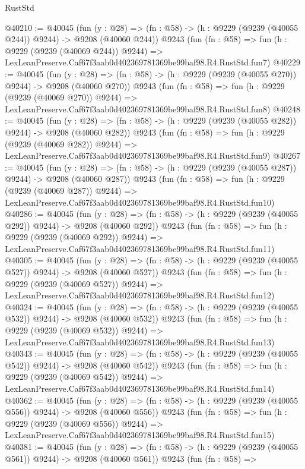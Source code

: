 \begin{lexlean}{RustStd}
\begin{coremodule}
@40210 := @40045
    (fun (y : @28) => (fn : @58) -> (h : @9229 (@9239 (@40055 @244)) @9244) -> @9208 (@40060 @244))
    @9243
    (fun (fn : @58) =>
    fun (h : @9229 (@9239 (@40069 @244)) @9244) =>
    LexLeanPreserve.Caf67f3aab0d402369781369be99baf98.R4.RustStd.fun7)
@40229 := @40045
    (fun (y : @28) => (fn : @58) -> (h : @9229 (@9239 (@40055 @270)) @9244) -> @9208 (@40060 @270))
    @9243
    (fun (fn : @58) =>
    fun (h : @9229 (@9239 (@40069 @270)) @9244) =>
    LexLeanPreserve.Caf67f3aab0d402369781369be99baf98.R4.RustStd.fun8)
@40248 := @40045
    (fun (y : @28) => (fn : @58) -> (h : @9229 (@9239 (@40055 @282)) @9244) -> @9208 (@40060 @282))
    @9243
    (fun (fn : @58) =>
    fun (h : @9229 (@9239 (@40069 @282)) @9244) =>
    LexLeanPreserve.Caf67f3aab0d402369781369be99baf98.R4.RustStd.fun9)
@40267 := @40045
    (fun (y : @28) => (fn : @58) -> (h : @9229 (@9239 (@40055 @287)) @9244) -> @9208 (@40060 @287))
    @9243
    (fun (fn : @58) =>
    fun (h : @9229 (@9239 (@40069 @287)) @9244) =>
    LexLeanPreserve.Caf67f3aab0d402369781369be99baf98.R4.RustStd.fun10)
@40286 := @40045
    (fun (y : @28) => (fn : @58) -> (h : @9229 (@9239 (@40055 @292)) @9244) -> @9208 (@40060 @292))
    @9243
    (fun (fn : @58) =>
    fun (h : @9229 (@9239 (@40069 @292)) @9244) =>
    LexLeanPreserve.Caf67f3aab0d402369781369be99baf98.R4.RustStd.fun11)
@40305 := @40045
    (fun (y : @28) => (fn : @58) -> (h : @9229 (@9239 (@40055 @527)) @9244) -> @9208 (@40060 @527))
    @9243
    (fun (fn : @58) =>
    fun (h : @9229 (@9239 (@40069 @527)) @9244) =>
    LexLeanPreserve.Caf67f3aab0d402369781369be99baf98.R4.RustStd.fun12)
@40324 := @40045
    (fun (y : @28) => (fn : @58) -> (h : @9229 (@9239 (@40055 @532)) @9244) -> @9208 (@40060 @532))
    @9243
    (fun (fn : @58) =>
    fun (h : @9229 (@9239 (@40069 @532)) @9244) =>
    LexLeanPreserve.Caf67f3aab0d402369781369be99baf98.R4.RustStd.fun13)
@40343 := @40045
    (fun (y : @28) => (fn : @58) -> (h : @9229 (@9239 (@40055 @542)) @9244) -> @9208 (@40060 @542))
    @9243
    (fun (fn : @58) =>
    fun (h : @9229 (@9239 (@40069 @542)) @9244) =>
    LexLeanPreserve.Caf67f3aab0d402369781369be99baf98.R4.RustStd.fun14)
@40362 := @40045
    (fun (y : @28) => (fn : @58) -> (h : @9229 (@9239 (@40055 @556)) @9244) -> @9208 (@40060 @556))
    @9243
    (fun (fn : @58) =>
    fun (h : @9229 (@9239 (@40069 @556)) @9244) =>
    LexLeanPreserve.Caf67f3aab0d402369781369be99baf98.R4.RustStd.fun15)
@40381 := @40045
    (fun (y : @28) => (fn : @58) -> (h : @9229 (@9239 (@40055 @561)) @9244) -> @9208 (@40060 @561))
    @9243
    (fun (fn : @58) =>

\end{coremodule}
\end{lexlean}
